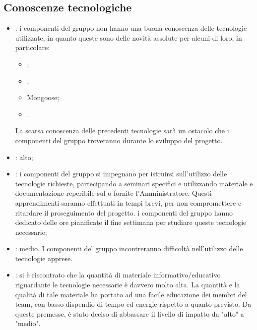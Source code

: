 \subsection{Conoscenze tecnologiche}
\begin{itemize}
\item {}: i componenti del gruppo non hanno una buona conoscenza delle tecnologie utilizzate, in quanto queste sono delle novità assolute per alcuni di loro, in particolare:
\begin{itemize}
\item {};
\item {};
\item Mongoose;
\item {}.
\end{itemize}
La scarsa conoscenza delle precedenti tecnologie sarà un ostacolo che i componenti del gruppo troveranno durante lo sviluppo del progetto.
\item {}: alto;
\item {}: i componenti del gruppo si impegnano per istruirsi sull'utilizzo delle tecnologie richieste, partecipando a seminari specifici e utilizzando materiale e documentazione reperibile sul  o fornite l'Amministratore. Questi apprendimenti saranno effettuati in tempi brevi, per non compromettere e ritardare il proseguimento del progetto. i componenti del gruppo hanno dedicato delle ore pianificate il fine settimana per studiare queste tecnologie necessarie;
\item {}: medio. I componenti del gruppo incontreranno difficoltà nell'utilizzo delle tecnologie apprese.
\item {}: si è riscontrato che la quantità di materiale informativo/educativo riguardante le tecnologie necessarie è davvero molto alta. La quantità e la qualità di tale materiale ha portato ad una facile educazione dei membri del team, con basso dispendio di tempo ed energie rispetto a quanto previsto. Da queste premesse, è stato deciso di abbassare il livello di impatto da "alto" a "medio". 
\end{itemize}

